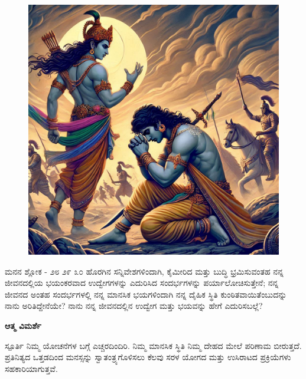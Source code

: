 \newpage
{} %
\thispagestyle{empty}
\begin{figure}
\centering
\includegraphics[width=\paperwidth, height=\paperheight]{./images/Arjuna2.png}
\end{figure}
\restoregeometry %

\newpage
\begin{mananam}{\mananamfont \large ಮನನ  ಶ್ಲೋಕ - ೨೮ ೨೯ ೩೦}
{\footnotesize \mananamtext  ಹೊರಗಿನ ಸನ್ನಿವೇಶಗಳಿಂದಾಗಿ,  ಕೈಮೀರಿದ  ಮತ್ತು ಬುದ್ಧಿ ಭ್ರಮಿಸುವಂತಹ ನನ್ನ ಜೀವನದಲ್ಲಿಯ ಭಯಂಕರವಾದ ಉದ್ವೇಗಗಳನ್ನು ಎದುರಿಸಿದ ಸಂದರ್ಭಗಳನ್ನು ಪರ್ಯಾಲೋಚಿಸುತ್ತೇನೆ; ನನ್ನ ಜೀವನದ ಅಂತಹ ಸಂದರ್ಭಗಳಲ್ಲಿ ನನ್ನ ಮಾನಸಿಕ ಭಯಗಳಿಂದಾಗಿ ನನ್ನ ದೈಹಿಕ ಸ್ಥಿತಿ ಕುಂಠಿತವಾಯಿತೆಂಬುದನ್ನು ನಾನು ಅರಿತಿದ್ದೇನೆಯೇ? ನಾನು ನನ್ನ ಜೀವನದಲ್ಲಿನ ಉದ್ವೇಗ ಮತ್ತು ಭಯವನ್ನು ಹೇಗೆ ಎದುರಿಸಬಲ್ಲೆ?}
\end{mananam}
\WritingHand\enspace\textbf{ಆತ್ಮ ವಿಮರ್ಶೆ}
\begin{inspiration}{\mananamfont \large ಸ್ಪೂರ್ತಿ}
{\footnotesize \mananamtext ನಿಮ್ಮ ಯೋಚನೆಗಳ ಬಗ್ಗೆ ಎಚ್ಚರದಿಂದಿರಿ. ನಿಮ್ಮ ಮಾನಸಿಕ ಸ್ಥಿತಿ ನಿಮ್ಮ ದೇಹದ ಮೇಲೆ ಪರಿಣಾಮ ಬೀರುತ್ತದೆ. ಪ್ರತಿನಿತ್ಯದ ಒತ್ತಡದಿಂದ ಮನಸ್ಸನ್ನು ಸ್ವಾತಂತ್ರ್ಯಗೊಳಿಸಲು ಕೆಲವು ಸರಳ ಯೋಗದ ಮತ್ತು ಉಸಿರಾಟದ ಪ್ರಕ್ರಿಯೆಗಳು ಸಹಕಾರಿಯಾಗುತ್ತವೆ.}
\end{inspiration}
\newpage

